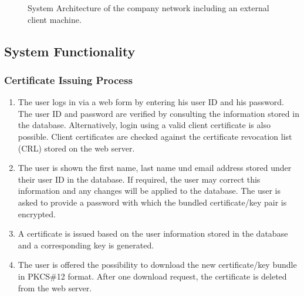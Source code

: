 \documentclass[english]{article}
\begin{document}
\begin{figure}[htb!]
\caption{System Architecture of the company network including an external client machine.}
\centering
\label{fig:system_arch}
\end{figure}


\subsection{System Functionality}


\subsubsection{Certificate Issuing Process}
\begin{enumerate}
\item The user logs in via a web form by entering his user ID and his password. The user ID and password are verified by consulting the information stored in the database. Alternatively, login using a valid client certificate is also possible.
Client certificates are checked against the certificate revocation list (CRL) stored on the web server.
\item The user is shown the first name, last name und email address stored under their user ID in the database. If required, the user may correct this information and any changes will be applied to the database. The user is asked to provide
a password with which the bundled certificate/key pair is encrypted. 
\item A certificate is issued based on the user information stored in the database and a corresponding key is generated.
\item The user is offered the possibility to download the new certificate/key bundle in PKCS\#12 format. After one download request, the certificate is deleted from the web server.
\end{enumerate}
\end{document}
